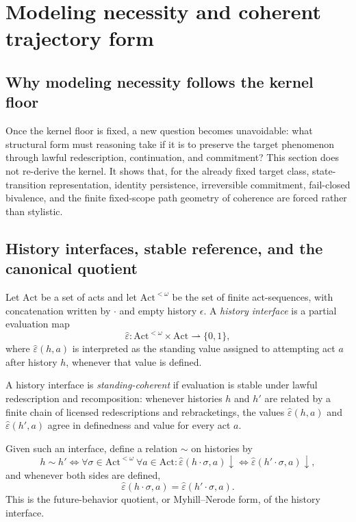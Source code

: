 \section{Modeling necessity and coherent trajectory form}
\label{sec:modeling-necessity}

\subsection{Why modeling necessity follows the kernel floor}

Once the kernel floor is fixed, a new question becomes unavoidable: what structural form must reasoning take if it is to preserve the target phenomenon through lawful redescription, continuation, and commitment? This section does not re-derive the kernel. It shows that, for the already fixed target class, state-transition representation, identity persistence, irreversible commitment, fail-closed bivalence, and the finite fixed-scope path geometry of coherence are forced rather than stylistic.

\subsection{History interfaces, stable reference, and the canonical quotient}

\begin{definition}
Let $\mathrm{Act}$ be a set of acts and let $\mathrm{Act}^{<\omega}$ be the set of finite act-sequences, with concatenation written by $\cdot$ and empty history $\epsilon$. A \emph{history interface} is a partial evaluation map
\[
\hat\varepsilon : \mathrm{Act}^{<\omega} \times \mathrm{Act} \rightharpoonup \{0,1\},
\]
where $\hat\varepsilon(h,a)$ is interpreted as the standing value assigned to attempting act $a$ after history $h$, whenever that value is defined.
\end{definition}

\begin{definition}
A history interface is \emph{standing-coherent} if evaluation is stable under lawful redescription and recomposition: whenever histories $h$ and $h'$ are related by a finite chain of licensed redescriptions and rebracketings, the values $\hat\varepsilon(h,a)$ and $\hat\varepsilon(h',a)$ agree in definedness and value for every act $a$.

Given such an interface, define a relation $\sim$ on histories by
\[
h \sim h' \iff \forall \sigma \in \mathrm{Act}^{<\omega}\ \forall a\in \mathrm{Act}:
\hat\varepsilon(h\cdot \sigma,a)\downarrow \Leftrightarrow \hat\varepsilon(h'\cdot \sigma,a)\downarrow,
\]
and whenever both sides are defined,
\[
\hat\varepsilon(h\cdot \sigma,a)=\hat\varepsilon(h'\cdot \sigma,a).
\]
This is the future-behavior quotient, or Myhill--Nerode form, of the history interface.
\end{definition}

